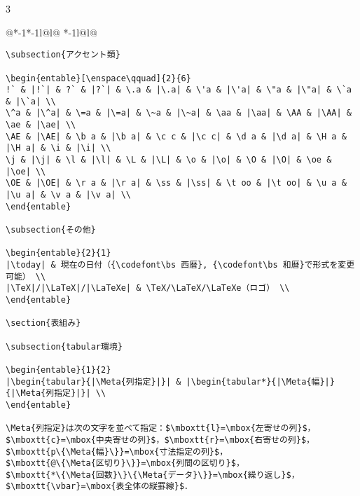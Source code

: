 \documentclass[10pt,a4paper,landscape,dvipdfmx]{jarticle}
\makeatletter
\def\set@etsep#1#2{\def\etcolsep{#1}\def\etitemsep{#2}}
\newenvironment{entable}[3][\quad\qquad]{%
  \set@etsep#1\relax\relax
  \begin{tabular}{%
    @{}*{\the\numexpr#3-1}{*{\the\numexpr#2-1}{l@{\etcolsep}}l@{\etitemsep}}%
    *{\the\numexpr#2-1}{l@{\etcolsep}}l@{}}}{%
  \end{tabular}}
\newcommand{\codefont}{\ttfamily\gtfamily}
\newcommand{\mboxtt}[1]{\mbox{\texttt{#1}}}
\newcommand{\Meta}[1]{$\langle$\mbox{}\emph{#1}\mbox{}$\rangle$}
\makeatother
\begin{document}
\begin{multicols}{3}
\begin{entable}[\enspace]{2}{1}
\begin{verbatim}
\subsection{アクセント類}

\begin{entable}[\enspace\qquad]{2}{6}
!` & |!`| & ?` & |?`| & \.a & |\.a| & \'a & |\'a| & \"a & |\"a| & \`a & |\`a| \\
\^a & |\^a| & \=a & |\=a| & \~a & |\~a| & \aa & |\aa| & \AA & |\AA| & \ae & |\ae| \\
\AE & |\AE| & \b a & |\b a| & \c c & |\c c| & \d a & |\d a| & \H a & |\H a| & \i & |\i| \\
\j & |\j| & \l & |\l| & \L & |\L| & \o & |\o| & \O & |\O| & \oe & |\oe| \\
\OE & |\OE| & \r a & |\r a| & \ss & |\ss| & \t oo & |\t oo| & \u a & |\u a| & \v a & |\v a| \\
\end{entable}

\subsection{その他}

\begin{entable}{2}{1}
|\today| & 現在の日付（{\codefont\bs 西暦}, {\codefont\bs 和暦}で形式を変更可能） \\
|\TeX|/|\LaTeX|/|\LaTeXe| & \TeX/\LaTeX/\LaTeXe（ロゴ） \\
\end{entable}

\section{表組み}

\subsection{tabular環境}

\begin{entable}{1}{2}
|\begin{tabular}{|\Meta{列指定}|}| & |\begin{tabular*}{|\Meta{幅}|}{|\Meta{列指定}|}| \\
\end{entable}

\Meta{列指定}は次の文字を並べて指定：$\mboxtt{l}=\mbox{左寄せの列}$，
$\mboxtt{c}=\mbox{中央寄せの列}$，$\mboxtt{r}=\mbox{右寄せの列}$，
$\mboxtt{p\{\Meta{幅}\}}=\mbox{寸法指定の列}$，
$\mboxtt{@\{\Meta{区切り}\}}=\mbox{列間の区切り}$，
$\mboxtt{*\{\Meta{回数}\}\{\Meta{データ}\}}=\mbox{繰り返し}$，
$\mboxtt{\vbar}=\mbox{表全体の縦罫線}$．


\end{verbatim}
\end{entable}
\end{multicols}
\end{document}
